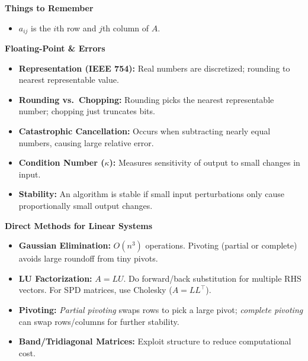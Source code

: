\documentclass[9pt,letterpaper]{article}
\begin{document}
\begin{multicols*}{3}

  \noindent \textbf{\large Things to Remember}
  \begin{itemize}
    \item $a_{ij}$ is the $i$th row and $j$th column of $A$.
  \end{itemize}

  \noindent
  \textbf{\large Floating-Point \& Errors}
  \begin{itemize}
    \item \textbf{Representation (IEEE 754):} Real numbers are discretized; rounding to nearest representable value.
    \item \textbf{Rounding vs.\ Chopping:} Rounding picks the nearest representable number; chopping just truncates bits.
    \item \textbf{Catastrophic Cancellation:} Occurs when subtracting nearly equal numbers, causing large relative error.
    \item \textbf{Condition Number ($\kappa$):} Measures sensitivity of output to small changes in input.
    \item \textbf{Stability:} An algorithm is stable if small input perturbations only cause proportionally small output changes.
  \end{itemize}

  \noindent
  \textbf{\large Direct Methods for Linear Systems}
  \begin{itemize}
    \item \textbf{Gaussian Elimination:} $O(n^3)$ operations. Pivoting (partial or complete) avoids large roundoff from tiny pivots.
    \item \textbf{LU Factorization:} $A=LU$. Do forward/back substitution for multiple RHS vectors. For SPD matrices, use Cholesky ($A=LL^\top$).
    \item \textbf{Pivoting:} \textit{Partial pivoting} swaps rows to pick a large pivot; \textit{complete pivoting} can swap rows/columns for further stability.
    \item \textbf{Band/Tridiagonal Matrices:} Exploit structure to reduce computational cost.
  \end{itemize}


\end{multicols*}
\end{document}
